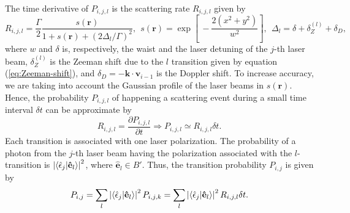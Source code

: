 The time derivative of $ P_{i,j,l} $ is the scattering rate $ R_{i,j,l} $ given by
\begin{equation}
    R_{i,j,l} = \frac{\Gamma}{2}\frac{s(\mathbf{r})}{1 + s(\mathbf{r}) + (2\Delta_l / \Gamma)^2},\ \ s(\mathbf{r}) = \exp\left[\ -\frac{2(x^2 + y^2)}{w^2} \right],\ \ \Delta_l = \delta + \delta_Z^{(l)} + \delta_D,
    \label{eq:scattering-rate-each-transition}
\end{equation}
where $ w $ and $ \delta $ is, respectively, the waist and the laser detuning of the $ j $-th laser beam, $ \delta_Z^{(l)} $ is the Zeeman shift due to the $ l $ transition given by equation (\ref{eq:Zeeman-shift}), and $ \delta_D = - \mathbf{k} \cdot \mathbf{v}_{i - 1} $ is the Doppler shift. To increase accuracy, we are taking into account the Gaussian profile of the laser beams in $ s(\mathbf{r}) $. Hence, the probability $ P_{i,j,l} $ of happening a scattering event during a small time interval $ \delta t $ can be approximate by
\begin{equation}
    R_{i,j,l} = \frac{\partial P_{i,j,l}}{\partial t} \Rightarrow P_{i,j,l} \simeq R_{i,j,l} \delta t.
\end{equation}
Each transition is associated with one laser polarization. The probability of a photon from the $j$-th laser beam having the polarization associated with the $ l $-transition is $ \left| \braket{\hat{\epsilon}_j|\mathbf{\hat{e}}_l} \right|^2 $, where $ \mathbf{\hat{e}}_l \in B' $. Thus, the transition probability $ P_{i,j} $ is given by
\begin{equation}
    P_{i,j} = \sum_{l} \left| \braket{\hat{\epsilon}_j|\mathbf{\hat{e}}_l} \right|^2 P_{i,j,k} =  \sum_{l} \left| \braket{\hat{\epsilon}_j|\mathbf{\hat{e}}_l} \right|^2 R_{i,j,l} \delta t.
    \label{eq:transition-probabilities}
\end{equation}
